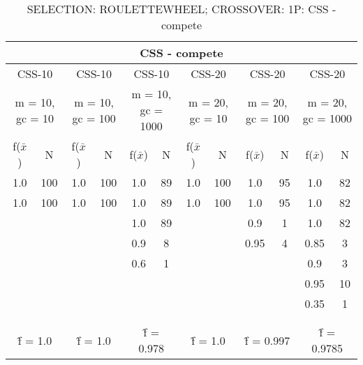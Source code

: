 \begin{table}[H]
	\centering
	\caption{SELECTION: ROULETTEWHEEL; CROSSOVER: 1P: CSS - compete}
	\begin{adjustbox}{width=1\textwidth}
		\begin{tabular}{ |c|c||c|c||c|c||c|c||c|c||c|c| }
			\hline
			\multicolumn{12}{|c|}{CSS - compete} \\
			\hline
			\multicolumn{2}{|c||}{CSS-10} & \multicolumn{2}{c||}{CSS-10} & \multicolumn{2}{c||}{CSS-10} & \multicolumn{2}{c||}{CSS-20} & \multicolumn{2}{c||}{CSS-20} & \multicolumn{2}{c|}{CSS-20}\\
			\hline
			\multicolumn{2}{|c||}{m = 10, gc = 10} & \multicolumn{2}{c||}{m = 10, gc = 100} & \multicolumn{2}{c||}{m = 10, gc = 1000} & \multicolumn{2}{c||}{m = 20, gc = 10} & \multicolumn{2}{c||}{m = 20, gc = 100} & \multicolumn{2}{c|}{m = 20, gc = 1000}\\
			\hline
			f($\bar{x}$) & N & f($\bar{x}$) & N & f($\bar{x}$) & N & f($\bar{x}$) & N & f($\bar{x}$) & N & f($\bar{x}$) & N\\
			\hline
			\hline
			1.0 & 100 & 1.0 & 100 & 1.0 & 89 & 1.0 & 100 & 1.0 & 95 & 1.0 & 82\\
			\hline
			1.0 & 100 & 1.0 & 100 & 1.0 & 89 & 1.0 & 100 & 1.0 & 95 & 1.0 & 82\\
			&   &   &   & 1.0 & 89 &   &   & 0.9 & 1 & 1.0 & 82\\
			&   &   &   & 0.9 & 8 &   &   & 0.95 & 4 & 0.85 & 3\\
			&   &   &   & 0.6 & 1 &   &   &   &   & 0.9 & 3\\
			&   &   &   &   &   &   &   &   &   & 0.95 & 10\\
			&   &   &   &   &   &   &   &   &   & 0.35 & 1\\
			&   &   &   &   &   &   &   &   &   &   &  \\
			&   &   &   &   &   &   &   &   &   &   &  \\
			\hline
			\multicolumn{2}{|c||}{\^{f} = 1.0} & \multicolumn{2}{c||}{\^{f} = 1.0} & \multicolumn{2}{c||}{\^{f} = 0.978} & \multicolumn{2}{c||}{\^{f} = 1.0} & \multicolumn{2}{c||}{\^{f} = 0.997} & \multicolumn{2}{c|}{\^{f} = 0.9785}\\
			\hline
		\end{tabular}
	\end{adjustbox}
\end{table}

